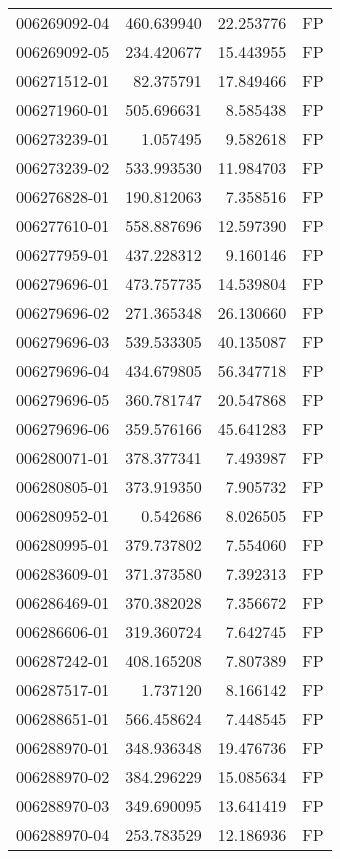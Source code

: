 \begin{tabular}{lrrl}
006269092-04 &  460.639940 &    22.253776 &   FP \\
006269092-05 &  234.420677 &    15.443955 &   FP \\
006271512-01 &   82.375791 &    17.849466 &   FP \\
006271960-01 &  505.696631 &     8.585438 &   FP \\
006273239-01 &    1.057495 &     9.582618 &   FP \\
006273239-02 &  533.993530 &    11.984703 &   FP \\
006276828-01 &  190.812063 &     7.358516 &   FP \\
006277610-01 &  558.887696 &    12.597390 &   FP \\
006277959-01 &  437.228312 &     9.160146 &   FP \\
006279696-01 &  473.757735 &    14.539804 &   FP \\
006279696-02 &  271.365348 &    26.130660 &   FP \\
006279696-03 &  539.533305 &    40.135087 &   FP \\
006279696-04 &  434.679805 &    56.347718 &   FP \\
006279696-05 &  360.781747 &    20.547868 &   FP \\
006279696-06 &  359.576166 &    45.641283 &   FP \\
006280071-01 &  378.377341 &     7.493987 &   FP \\
006280805-01 &  373.919350 &     7.905732 &   FP \\
006280952-01 &    0.542686 &     8.026505 &   FP \\
006280995-01 &  379.737802 &     7.554060 &   FP \\
006283609-01 &  371.373580 &     7.392313 &   FP \\
006286469-01 &  370.382028 &     7.356672 &   FP \\
006286606-01 &  319.360724 &     7.642745 &   FP \\
006287242-01 &  408.165208 &     7.807389 &   FP \\
006287517-01 &    1.737120 &     8.166142 &   FP \\
006288651-01 &  566.458624 &     7.448545 &   FP \\
006288970-01 &  348.936348 &    19.476736 &   FP \\
006288970-02 &  384.296229 &    15.085634 &   FP \\
006288970-03 &  349.690095 &    13.641419 &   FP \\
006288970-04 &  253.783529 &    12.186936 &   FP \\

\end{tabular}
